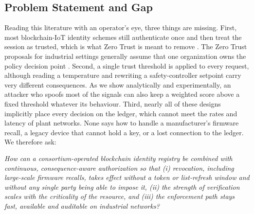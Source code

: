 \subsection{Problem Statement and Gap}
Reading this literature with an operator's eye, three things are missing. First, most blockchain-IoT identity schemes still authenticate once and then treat the session as trusted, which is what Zero Trust is meant to remove \cite{wang2026medicaliot,james2024authz}. The Zero Trust proposals for industrial settings generally assume that one organization owns the policy decision point \cite{kumar2024industry40,zanasi2024flexible}. Second, a single trust threshold is applied to every request, although reading a temperature and rewriting a safety-controller setpoint carry very different consequences. As we show analytically and experimentally, an attacker who spoofs most of the signals can also keep a weighted score above a fixed threshold whatever its behaviour. Third, nearly all of these designs implicitly place every decision on the ledger, which cannot meet the rates and latency of plant networks. None says how to handle a manufacturer's firmware recall, a legacy device that cannot hold a key, or a lost connection to the ledger. We therefore ask:

\emph{How can a consortium-operated blockchain identity registry be combined with continuous, consequence-aware authorization so that (i) revocation, including large-scale firmware recalls, takes effect without a token or list-refresh window and without any single party being able to impose it, (ii) the strength of verification scales with the criticality of the resource, and (iii) the enforcement path stays fast, available and auditable on industrial networks?}

